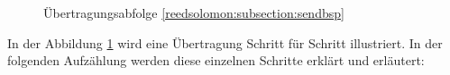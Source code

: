 \begin{figure}%
	\centering
	\caption{Übertragungsabfolge \ref{reedsolomon:subsection:sendbsp}}
	\label{fig:sendorder}
\end{figure}
In der Abbildung \ref{fig:sendorder} wird eine Übertragung Schritt für Schritt illustriert.
In der folgenden Aufzählung werden diese einzelnen Schritte erklärt und erläutert:
